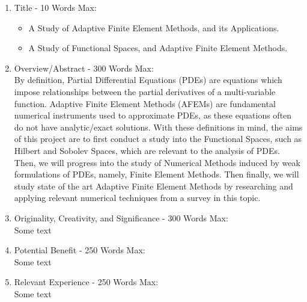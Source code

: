 \documentclass[11pt]{article}
\begin{document}
\pagestyle{fancy}
\fancyhead{}
\fancyhead[L]{\textbf{\rightmark}}

\begin{enumerate}

\item Title - 10 Words Max:
\begin{itemize}
\item A Study of Adaptive Finite Element Methods, and its Applications.
\item A Study of Functional Spaces, and Adaptive Finite Element Methods.
\end{itemize}

\item Overview/Abstract - 300 Words Max: \\
By definition, Partial Differential Equations (PDEs) are equations which impose relationships
between the partial derivatives of a multi-variable function. Adaptive Finite Element Methods (AFEMs)
are fundamental numerical instruments used to approximate PDEs, as these equations often do not have
analytic/exact solutions. 
With these definitions in mind, the aims of this project are to first conduct a study into the Functional Spaces, such as
Hilbert and Sobolev Spaces, which are relevant
to the analysis of PDEs. Then, we will progress into the study of Numerical Methods induced by weak formulations
of PDEs, namely, Finite Element Methods. Then finally, we will study state of the art Adaptive
Finite Element Methods by researching and applying relevant numerical techniques from a survey in this topic.

\item Originality, Creativity, and Significance - 300 Words Max: \\
Some text

\item Potential Benefit - 250 Words Max: \\
Some text

\item Relevant Experience - 250 Words Max: \\
Some text

\end{enumerate}
\end{document}
